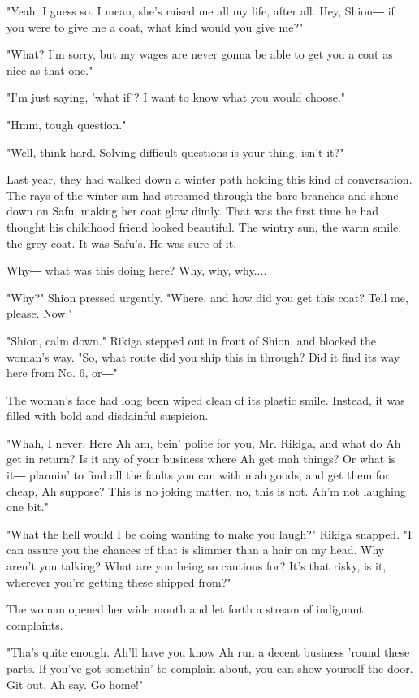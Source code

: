 "Yeah, I guess so. I mean, she's raised me all my life, after all. Hey,
Shion― if you were to give me a coat, what kind would you give me?"

"What? I'm sorry, but my wages are never gonna be able to get you a coat
as nice as that one."

"I'm just saying, 'what if'? I want to know what you would choose."

"Hmm, tough question."

"Well, think hard. Solving difficult questions is your thing, isn't it?"

Last year, they had walked down a winter path holding this kind of
conversation. The rays of the winter sun had streamed through the bare
branches and shone down on Safu, making her coat glow dimly. That was
the first time he had thought his childhood friend looked beautiful. The
wintry sun, the warm smile, the grey coat. It was Safu's. He was sure of
it.

Why― what was this doing here? Why, why, why....

"Why?" Shion pressed urgently. "Where, and how did you get this coat?
Tell me, please. Now."

"Shion, calm down." Rikiga stepped out in front of Shion, and blocked
the woman's way. "So, what route did you ship this in through? Did it
find its way here from No. 6, or―"

The woman's face had long been wiped clean of its plastic smile.
Instead, it was filled with bold and disdainful suspicion.

"Whah, I never. Here Ah am, bein' polite for you, Mr. Rikiga, and what
do Ah get in return? Is it any of your business where Ah get mah things?
Or what is it― plannin' to find all the faults you can with mah goods,
and get them for cheap, Ah suppose? This is no joking matter, no, this
is not. Ah'm not laughing one bit."

"What the hell would I be doing wanting to make you laugh?" Rikiga
snapped. "I can assure you the chances of that is slimmer than a hair on
my head. Why aren't you talking? What are you being so cautious for?
It's that risky, is it, wherever you're getting these shipped from?"

The woman opened her wide mouth and let forth a stream of indignant
complaints.~

"Tha's quite enough. Ah'll have you know Ah run a decent business 'round
these parts. If you've got somethin' to complain about, you can show
yourself the door. Git out, Ah say. Go home!"

